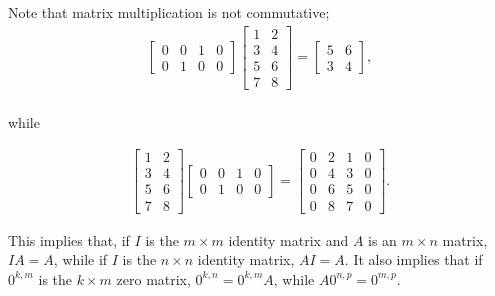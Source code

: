 \documentclass[12pt]{article}
\begin{document}
\begin{comm}
  Note that matrix multiplication is not commutative;
  \begin{align*}
    \begin{bmatrix}
      0 & 0 & 1 & 0\\
      0 & 1 & 0 & 0
    \end{bmatrix}
    \begin{bmatrix}
      1 & 2\\
      3 & 4\\
      5 & 6\\
      7 & 8
    \end{bmatrix}
    =
    \begin{bmatrix}
      5 & 6\\
      3 & 4
    \end{bmatrix},\\
  \end{align*}
  \begin{center}
    while
  \end{center}
  \begin{align*}
    \begin{bmatrix}
      1 & 2\\
      3 & 4\\
      5 & 6\\
      7 & 8
    \end{bmatrix}
    \begin{bmatrix}
      0 & 0 & 1 & 0\\
      0 & 1 & 0 & 0
    \end{bmatrix}
    =
    \begin{bmatrix}
      0 & 2 & 1 & 0\\
      0 & 4 & 3 & 0\\
      0 & 6 & 5 & 0\\
      0 & 8 & 7 & 0
    \end{bmatrix}.
  \end{align*}

  This implies that, if $I$ is the $m \times m$ identity matrix
  and $A$ is an $m \times n$ matrix, $IA = A$, while if $I$ is
  the $n \times n$ identity matrix, $AI = A$. It also implies
  that if $0^{k,m}$ is the $k \times m$ zero matrix, $0^{k,n} =
  0^{k,m}A$, while $A0^{n,p} = 0^{m,p}$.
\end{comm}
\end{document}
